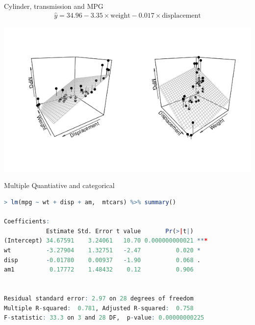 \documentclass{beamer}
\begin{document}
\begin{frame}{Cylinder, transmission and MPG}
\begin{align*}
\hat{y} = 34.96 - 3.35 \times \text{weight} - 0.017 \times \text{displacement}
\end{align*}
\begin{center}
\includegraphics[scale=0.5]{wt_disp_mpg.png}
\end{center}
\end{frame}




\begin{frame}[fragile]{Multiple Quantiative and categorical}
\footnotesize

\begin{lstlisting}[language=R]
> lm(mpg ~ wt + disp + am,  mtcars) %>% summary()

Coefficients:
            Estimate Std. Error t value       Pr(>|t|)    
(Intercept) 34.67591    3.24061   10.70 0.000000000021 ***
wt          -3.27904    1.32751   -2.47          0.020 *  
disp        -0.01780    0.00937   -1.90          0.068 .  
am1          0.17772    1.48432    0.12          0.906    


Residual standard error: 2.97 on 28 degrees of freedom
Multiple R-squared:  0.781,	Adjusted R-squared:  0.758 
F-statistic: 33.3 on 3 and 28 DF,  p-value: 0.00000000225
\end{lstlisting}


\end{frame}
\end{document}
